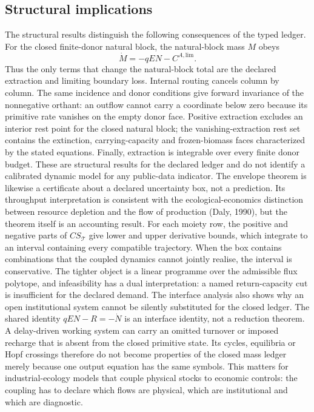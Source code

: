 \documentclass[11pt]{article}
\begin{document}
\subsection{Structural implications}
The structural results distinguish the following consequences of the typed ledger. For the closed finite-donor natural block, the natural-block mass \(M\) obeys
\[\dot M=-qEN-C^{A,\mathrm{lim}}.\]
Thus the only terms that change the natural-block total are the declared extraction and limiting boundary loss. Internal routing cancels column by column. The same incidence and donor conditions give forward invariance of the nonnegative orthant: an outflow cannot carry a coordinate below zero because its primitive rate vanishes on the empty donor face. Positive extraction excludes an interior rest point for the closed natural block; the vanishing-extraction rest set contains the extinction, carrying-capacity and frozen-biomass faces characterized by the stated equations. Finally, extraction is integrable over every finite donor budget. These are structural results for the declared ledger and do not identify a calibrated dynamic model for any public-data indicator.
The envelope theorem is likewise a certificate about a declared uncertainty box, not a prediction. Its throughput interpretation is consistent with the ecological-economics distinction between resource depletion and the flow of production (Daly, 1990), but the theorem itself is an accounting result. For each moiety row, the positive and negative parts of \(CS_{\mathcal T}\) give lower and upper derivative bounds, which integrate to an interval containing every compatible trajectory. When the box contains combinations that the coupled dynamics cannot jointly realise, the interval is conservative. The tighter object is a linear programme over the admissible flux polytope, and infeasibility has a dual interpretation: a named return-capacity cut is insufficient for the declared demand.
The interface analysis also shows why an open institutional system cannot be silently substituted for the closed ledger. The shared identity \(qEN-R=-\dot N\) is an interface identity, not a reduction theorem. A delay-driven working system can carry an omitted turnover or imposed recharge that is absent from the closed primitive state. Its cycles, equilibria or Hopf crossings therefore do not become properties of the closed mass ledger merely because one output equation has the same symbols. This matters for industrial-ecology models that couple physical stocks to economic controls: the coupling has to declare which flows are physical, which are institutional and which are diagnostic.
\end{document}
